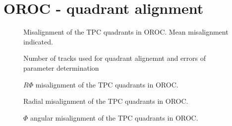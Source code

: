 \documentclass{elsart}
\begin{document}
\section{OROC - quadrant alignment}


\begin{figure}
  \centering{}
 \label{figLocalZDistortion}
\caption{ Misalignment of the TPC quadrants in OROC. Mean misalignment indicated. }	
\end{figure}

\begin{figure}
  \centering{}
 \label{figLocalZDistortion}
\caption{Number of tracks used  for quadrant alignemnt and errors of parameter determination}	
\end{figure}


\begin{figure}
  \centering{}
 \label{fig:OROCDeltaRPhi}
\caption{ $R\Phi$ misalignment of the TPC quadrants in OROC.  }	
\end{figure}

\begin{figure}
  \centering{}
 \label{fig:OROCDeltaRPhi}
\caption{ Radial misalignment of the TPC quadrants in OROC.  }	
\end{figure}

\begin{figure}
  \centering{}
 \label{fig:OROCDeltaRPhi}
\caption{ $\Phi$ angular misalignment of the TPC quadrants in OROC.  }	
\end{figure}






\end{document}
